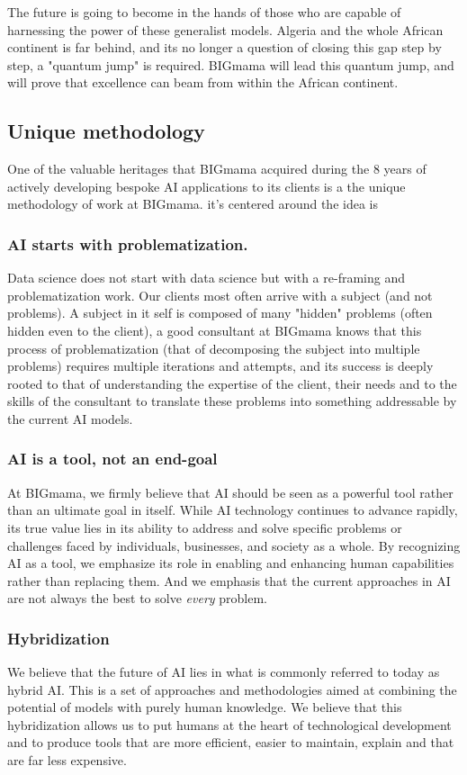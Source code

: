 \documentclass[a4paper,12pt]{article}
\begin{document}
The future is going to become in the hands of those who are capable of harnessing the power of these generalist models. Algeria and the whole African continent is far behind, and its no longer a question of closing this gap step by step, a "quantum jump" is required. BIGmama will lead this quantum jump, and will prove that excellence can beam from within the African continent. 

\subsection{Unique methodology}
One of the valuable heritages that BIGmama acquired during the 8 years of actively developing bespoke AI applications to its clients is a the unique methodology of work at BIGmama. it's centered around the idea is 

\subsubsection{AI starts with problematization.}
Data science does not start with data science but with a re-framing and problematization work. Our clients most often arrive with a subject (and not problems). A subject in it self is composed of many "hidden" problems (often hidden even to the client), a good consultant at BIGmama knows that this process of problematization (that of decomposing the subject into multiple problems) requires multiple iterations and attempts, and its success is deeply rooted to that of understanding the expertise of the client, their needs and to the skills of the consultant to translate these problems into something addressable by the current AI models.

\subsubsection{AI is a tool, not an end-goal}
At BIGmama, we firmly believe that AI should be seen as a powerful tool rather than an ultimate goal in itself. While AI technology continues to advance rapidly, its true value lies in its ability to address and solve specific problems or challenges faced by individuals, businesses, and society as a whole.
By recognizing AI as a tool, we emphasize its role in enabling and enhancing human capabilities rather than replacing them. And we emphasis that the current approaches in AI are not always the best to solve \textit{every} problem.

\subsubsection{Hybridization}
We believe that the future of AI lies in what is commonly referred to today as hybrid AI. This is a set of approaches and methodologies aimed at combining the potential of models with purely human knowledge. We believe that this hybridization allows us to put humans at the heart of technological development and to produce tools that are more efficient, easier to maintain, explain and that are far less expensive.
\end{document}
